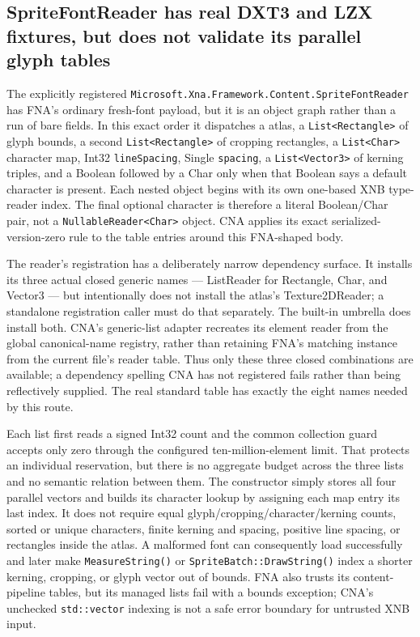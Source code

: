 \subsection{SpriteFontReader has real DXT3 and LZX fixtures, but does not validate its parallel glyph tables}
\label{sec:xnb-spritefont-reader-contract}

The explicitly registered
\texttt{Microsoft.Xna.Framework.Content.SpriteFontReader} has FNA's ordinary fresh-font payload,
but it is an object graph rather than a run of bare fields. In this exact order it dispatches a
 atlas, a \texttt{List<Rectangle>} of glyph bounds, a second
\texttt{List<Rectangle>} of cropping rectangles, a \texttt{List<Char>} character map, Int32
\texttt{lineSpacing}, Single \texttt{spacing}, a \texttt{List<Vector3>} of kerning triples, and
a Boolean followed by a Char only when that Boolean says a default character is present. Each
nested object begins with its own one-based XNB type-reader index. The final optional character
is therefore a literal Boolean/Char pair, not a \texttt{NullableReader<Char>} object. CNA applies
its exact serialized-version-zero rule to the table entries around this FNA-shaped body.

The reader's registration has a deliberately narrow dependency surface. It installs its three
actual closed generic names --- ListReader for Rectangle, Char, and Vector3 --- but intentionally
does not install the atlas's Texture2DReader; a standalone registration caller must do that
separately. The built-in umbrella does install both. CNA's generic-list adapter recreates its
element reader from the global canonical-name registry, rather than retaining FNA's matching
instance from the current file's reader table. Thus only these three closed combinations are
available; a dependency spelling CNA has not registered fails rather than being reflectively
supplied. The real standard table has exactly the eight names needed by this route.

Each list first reads a signed Int32 count and the common collection guard accepts only zero
through the configured ten-million-element limit. That protects an individual reservation, but
there is no aggregate budget across the three lists and no semantic relation between them. The
constructor simply stores all four parallel vectors and builds its character lookup by assigning
each map entry its last index. It does not require equal glyph/cropping/character/kerning counts,
sorted or unique characters, finite kerning and spacing, positive line spacing, or rectangles
inside the atlas. A malformed font can consequently load successfully and later make
\texttt{MeasureString()} or \texttt{SpriteBatch::DrawString()} index a shorter kerning, cropping,
or glyph vector out of bounds. FNA also trusts its content-pipeline tables, but its managed lists
fail with a bounds exception; CNA's unchecked \texttt{std::vector} indexing is not a safe error
boundary for untrusted XNB input.

